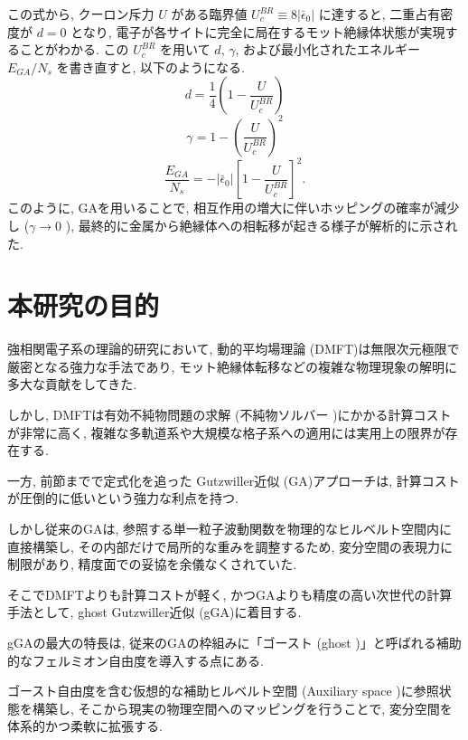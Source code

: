 この式から, クーロン斥力 $U$ がある臨界値 $U_c^{BR} \equiv 8|\bar{\epsilon}_0|$ に達すると, 二重占有密度が $d = 0$ となり, 電子が各サイトに完全に局在するモット絶縁体状態が実現することがわかる. この $U_c^{BR}$ を用いて $d$, $\gamma$, および最小化されたエネルギー $E_{GA}/N_s$ を書き直すと, 以下のようになる.
\begin{equation}
    d = \frac{1}{4} \left( 1 - \frac{U}{U_c^{BR}} \right)
    \label{eq:d_final}
\end{equation}
\begin{equation}
    \gamma = 1 - \left( \frac{U}{U_c^{BR}} \right)^2 
    \label{eq:gamma_final}
\end{equation}
\begin{equation}
    \frac{E_{GA}}{N_s} = -|\bar{\epsilon}_0| \left[ 1 - \frac{U}{U_c^{BR}} \right]^2 .
    \label{eq:E_GA_final}
\end{equation}
このように, GAを用いることで, 相互作用の増大に伴いホッピングの確率が減少し ($\gamma \to 0$ ), 最終的に金属から絶縁体への相転移が起きる様子が解析的に示された.

\section{本研究の目的}

強相関電子系の理論的研究において, 動的平均場理論 (DMFT)は無限次元極限で厳密となる強力な手法であり, モット絶縁体転移などの複雑な物理現象の解明に多大な貢献をしてきた. 

しかし, DMFTは有効不純物問題の求解 (不純物ソルバー )にかかる計算コストが非常に高く, 複雑な多軌道系や大規模な格子系への適用には実用上の限界が存在する. 

一方, 前節までで定式化を追った Gutzwiller近似 (GA)アプローチは, 計算コストが圧倒的に低いという強力な利点を持つ. 

しかし従来のGAは, 参照する単一粒子波動関数を物理的なヒルベルト空間内に直接構築し, その内部だけで局所的な重みを調整するため, 変分空間の表現力に制限があり, 精度面での妥協を余儀なくされていた. 

そこでDMFTよりも計算コストが軽く, かつGAよりも精度の高い次世代の計算手法として, ghost Gutzwiller近似 (gGA)に着目する.

gGAの最大の特長は, 従来のGAの枠組みに「ゴースト (ghost )」と呼ばれる補助的なフェルミオン自由度を導入する点にある. 

ゴースト自由度を含む仮想的な補助ヒルベルト空間 (Auxiliary space )に参照状態を構築し, そこから現実の物理空間へのマッピングを行うことで, 変分空間を体系的かつ柔軟に拡張する. 

